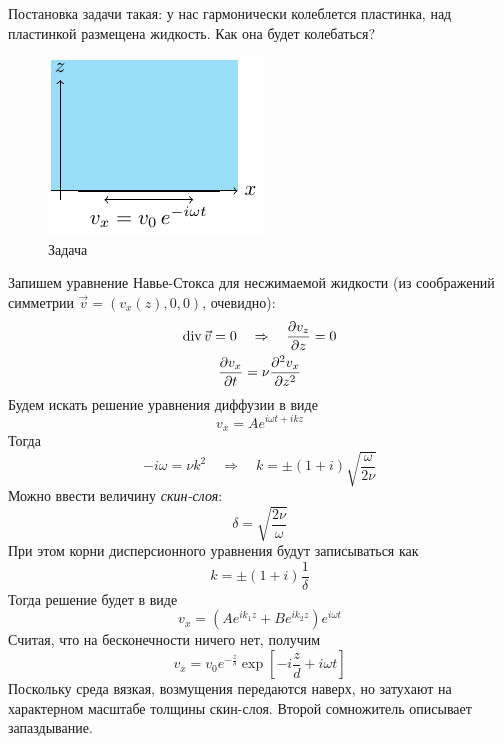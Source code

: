 Постановка задачи такая: у нас гармонически колеблется пластинка, над пластинкой размещена жидкость. Как она будет колебаться?
\begin{figure}[h!]
    \centering
    \includegraphics[scale=1.5]{img/koleb}
    \caption{Задача}
    \label{fig:figure1}
\end{figure}
Запишем уравнение Навье-Стокса для несжимаемой жидкости (из соображений симметрии $\vec{v}=(v_x (z),0,0)$, очевидно):
\begin{gather}
    \operatorname{div} \vec{v} = 0 \quad \Rightarrow \quad \pdv{v_z}{z} = 0\\
    \pdv{v_x}{t} = \nu \pdv[2]{v_x}{z}
\end{gather}
Будем искать решение уравнения диффузии в виде 
\begin{equation}
    v_x = A e^{i\omega t + ikz}
\end{equation}
Тогда
\begin{equation}
    -i \omega = \nu k^2 \quad \Rightarrow \quad
    k = \pm(1+i) \sqrt{\frac{\omega}{2\nu}}
\end{equation}
Можно ввести величину \textit{скин-слоя}:
\begin{equation}
    \delta=\sqrt{\frac{2\nu}{\omega}}
\end{equation}
При этом корни дисперсионного уравнения будут записываться как
\begin{equation}
    k=\pm (1+i) \frac{1}{\delta}
\end{equation}
Тогда решение будет в виде
\begin{equation}
    v_x=(Ae^{ik_1 z}+Be^{ik_2 z})e^{i\omega t}
\end{equation}
Считая, что на бесконечности ничего нет, получим
\begin{equation}
    v_x=v_0 e^{-\frac{z}{\delta}} \exp[-i \frac{z}{d}+ i\omega t]
\end{equation}
Поскольку среда вязкая, возмущения передаются наверх, но затухают на характерном масштабе толщины скин-слоя. Второй сомножитель описывает запаздывание. 

